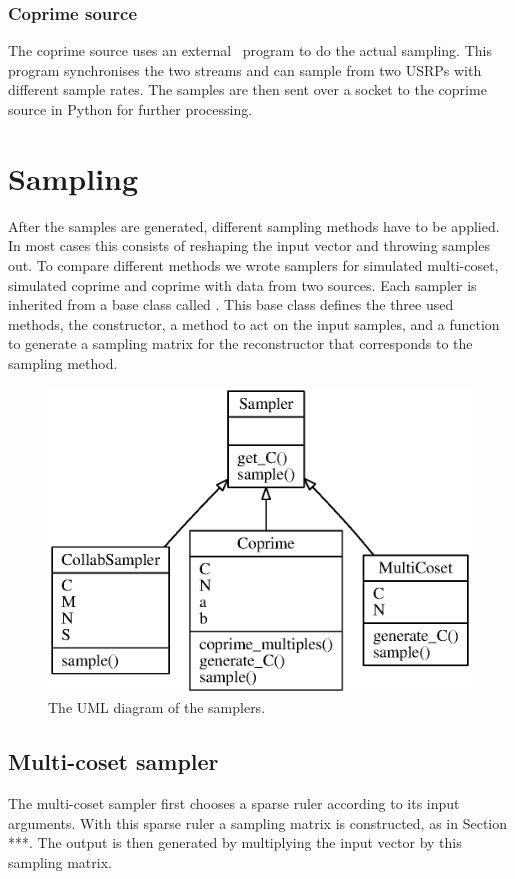 \documentclass[a4paper, openany, oneside]{memoir}
\begin{document}
\subsubsection{Coprime source}
The coprime source uses an external \CC~program to do the actual sampling. This program synchronises the two streams and can sample from two USRPs with different sample rates. The samples are then sent over a socket to the coprime source in Python for further processing.


\section{Sampling}
\label{sec:sampling}
After the samples are generated, different sampling methods have to be applied. In most cases this consists of reshaping the input vector and throwing samples out. To compare different methods we wrote samplers for simulated multi-coset, simulated coprime and coprime with data from two sources. Each sampler is inherited from a base class called . This base class defines the three used methods, the constructor, a  method to act on the input samples, and a  function to generate a sampling matrix for the reconstructor that corresponds to the sampling method.

\begin{figure}
    \centering
    \includegraphics{./figures/classes_sampling.eps}
    \caption{The UML diagram of the samplers.}
    \label{fig:}
\end{figure}

\subsection{Multi-coset sampler}
\label{sec:multi-coset-sampler}
The multi-coset sampler first chooses a sparse ruler according to its input arguments. With this sparse ruler a sampling matrix is constructed, as in Section ***. The output is then generated by multiplying the input vector by this sampling matrix.
\end{document}
